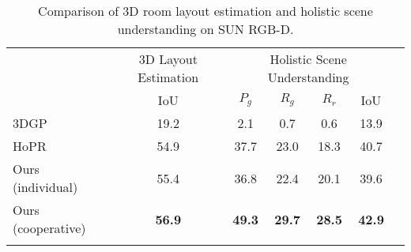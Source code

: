 \documentclass{article}
\begin{document}
\begin{table}[t!]
    \caption{Comparison of 3D room layout estimation and holistic scene understanding on SUN RGB-D.}
    \setlength{\tabcolsep}{4pt}
    \centering
    \begin{tabular}{l|c| c c c c c}
        \Xhline{2\arrayrulewidth}
        \multirow{2}{*}{Method} & \multicolumn{1}{c||}{3D Layout Estimation} & \multicolumn{4}{c}{Holistic Scene Understanding} \\
         & IoU & $P_g$ & $R_g$ & $R_r$ & IoU \\
        \hline
        3DGP \citep{choi2013understanding}  & 19.2 & 2.1 & 0.7 & 0.6 & 13.9 \\
        HoPR \citep{huang2018holistic}  & 54.9 & 37.7 & 23.0 & 18.3 & 40.7 \\
        Ours (individual)  & 55.4 & 36.8 & 22.4 & 20.1 & 39.6\\
        Ours (cooperative)  & \textbf{56.9} & \textbf{49.3} & \textbf{29.7} & \textbf{28.5} & \textbf{42.9} \\
        \Xhline{2\arrayrulewidth}
    \end{tabular}
    \label{tab:holistic}
\end{table} 
\begin{table}[t!]
    \caption{Comparisons of 3D object detection on SUN RGB-D.}
    \setlength{\tabcolsep}{4pt}
    \centering
    \label{tab:detection}
\end{table}
\end{document}
